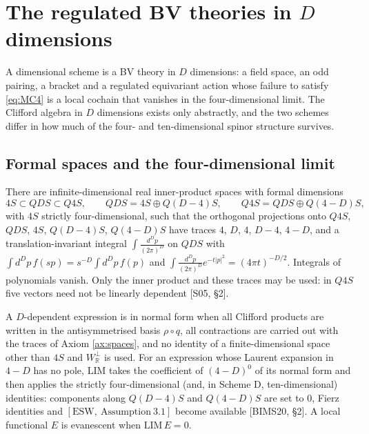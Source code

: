 
\section{The regulated BV theories in \texorpdfstring{$D$}{D} dimensions}
\label{sec:schemes}

A dimensional scheme is a BV theory in $D$ dimensions: a field space, an odd pairing, a bracket and a regulated equivariant action whose failure to satisfy \eqref{eq:MC4} is a local cochain that vanishes in the four-dimensional limit. The Clifford algebra in $D$ dimensions exists only abstractly, and the two schemes differ in how much of the four- and ten-dimensional spinor structure survives.

\subsection{Formal spaces and the four-dimensional limit}

\begin{axiom}
\label{ax:spaces}
There are infinite-dimensional real inner-product spaces with formal dimensions
\[
4S\subset QDS\subset Q4S,\qquad QDS=4S\oplus Q(D{-}4)S,\qquad Q4S=QDS\oplus Q(4{-}D)S,
\]
with $4S$ strictly four-dimensional, such that the orthogonal projections onto $Q4S$, $QDS$, $4S$, $Q(D{-}4)S$, $Q(4{-}D)S$ have traces $4$, $D$, $4$, $D-4$, $4-D$, and a translation-invariant integral $\int\frac{d^Dp}{(2\pi)^D}$ on $QDS$ with $\int d^Dp\,f(sp)=s^{-D}\int d^Dp\,f(p)$ and $\int\frac{d^Dp}{(2\pi)^D}e^{-t|p|^2}=(4\pi t)^{-D/2}$. Integrals of polynomials vanish. Only the inner product and these traces may be used: in $Q4S$ five vectors need not be linearly dependent [S05, §2].
\end{axiom}

\begin{definition}
\label{def:lim}
A $D$-dependent expression is in normal form when all Clifford products are written in the antisymmetrised basis $\rho\circ q$, all contractions are carried out with the traces of Axiom \ref{ax:spaces}, and no identity of a finite-dimensional space other than $4S$ and $W^\perp_{\mathbb R}$ is used. For an expression whose Laurent expansion in $4-D$ has no pole, $\mathrm{LIM}$ takes the coefficient of $(4-D)^0$ of its normal form and then applies the strictly four-dimensional (and, in Scheme D, ten-dimensional) identities: components along $Q(D{-}4)S$ and $Q(4{-}D)S$ are set to $0$, Fierz identities and $[\mathrm{ESW},\ \mathrm{Assumption}\ 3.1]$ become available [BIMS20, §2]. A local functional $E$ is evanescent when $\mathrm{LIM}\,E=0$.
\end{definition}

